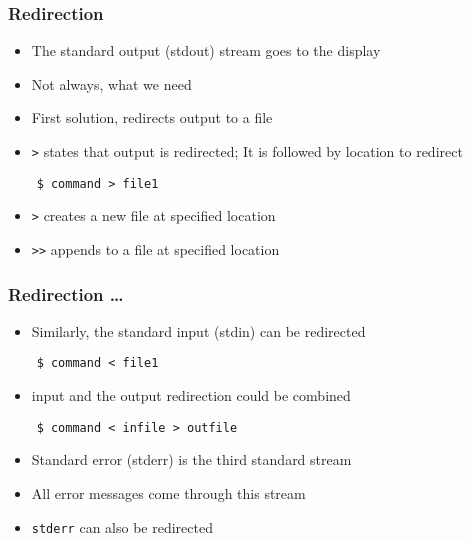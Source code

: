 \documentclass[12pt,compress]{beamer}
\begin{document}
\begin{frame}[fragile]
  \frametitle{Redirection} 

  \begin{itemize}
  \item The standard output (stdout) stream goes to the display
  \item Not always, what we need
  \item First solution, redirects output to a file
  \item \texttt{>} states that output is redirected; It is
    followed by location to redirect
  \end{itemize}
  \begin{lstlisting}
    $ command > file1
  \end{lstlisting} %
  \begin{itemize}
  \item \texttt{>} creates a new file at specified location
  \item \texttt{>>} appends to a file at specified location
  \end{itemize}
\end{frame}

\begin{frame}[fragile]
  \frametitle{Redirection \ldots} 
  \begin{itemize}
  \item Similarly, the standard input (stdin) can be redirected
  \end{itemize}
  \begin{lstlisting}
    $ command < file1
  \end{lstlisting} %
  \begin{itemize}
  \item input and the output redirection could be combined
  \end{itemize}
  \begin{lstlisting}
    $ command < infile > outfile
  \end{lstlisting} %
  \begin{itemize}
  \item Standard error (stderr) is the third standard stream
  \item All error messages come through this stream
  \item \texttt{stderr} can also be redirected
  \end{itemize}
\end{frame}
\end{document}
